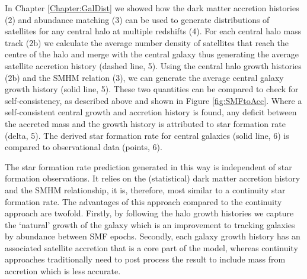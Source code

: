 In Chapter \ref{Chapter:GalDist} we showed how the \textcolor{MPLred}{dark matter accretion histories (2)} and abundance matching (3) can be used to generate \textcolor{MPLblue}{distributions of satellites for any central halo at multiple redshifts (4)}. For each \textcolor{MPLred}{central halo mass track (2b)} we calculate the average number density of satellites that reach the centre of the halo and merge with the central galaxy \textcolor{MPLblue}{thus generating the average satellite accretion history (dashed line, 5)}. \textcolor{MPLred}{Using the central halo growth histories (2b)} and the SMHM relation (3), we can generate the \textcolor{MPLblue}{average central galaxy growth history (solid line, 5)}. These two quantities can be compared to check for self-consistency, as described above and shown in Figure \ref{fig:SMFtoAcc}. Where a self-consistent central growth and accretion history is found, any deficit between the accreted mass and the growth history is attributed to \textcolor{MPLblue}{star formation rate (delta, 5)}. \textcolor{MPLblue}{The derived star formation rate for central galaxies (solid line, 6) is compared to observational data (points, 6)}. 

The star formation rate prediction generated in this way is independent of star formation observations. It relies on the (statistical) dark matter accretion history and the SMHM relationship, it is, therefore, most similar to a continuity star formation rate. The advantages of this approach compared to the continuity approach are twofold. Firstly, by following the halo growth histories we capture the `natural' growth of the galaxy which is an improvement to tracking galaxies by abundance between SMF epochs. Secondly, each galaxy growth history has an associated satellite accretion that is a core part of the model, whereas continuity approaches traditionally need to post process the result to include mass from accretion which is less accurate.

